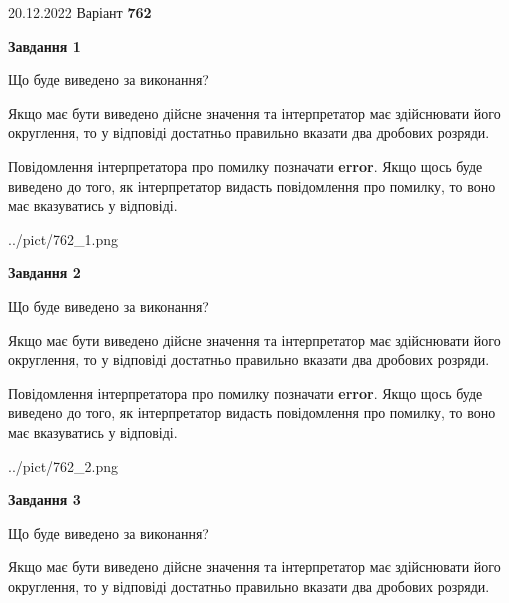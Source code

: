 \documentclass[12pt, ukrainian]{article}
\begin{document}
{20.12.2022 Варіант \No \textbf { 762 }\par}
{
\begin {Large}

{\begin {center}\textbf{Завдання 1}\end {center}}\par
Що буде виведено за виконання? \par

Якщо має бути виведено дійсне значення та інтерпретатор має здійснювати його округлення, 
то у відповіді достатньо правильно вказати два дробових розряди.

Повідомлення інтерпретатора про помилку позначати \textbf{error}.
Якщо щось буде виведено до того, як інтерпретатор видасть повідомлення про помилку, 
то воно має вказуватись у відповіді. \par

\begin{center}
	{../pict/762_1.png}
\end{center}
\newpage

{\begin {center}\textbf{Завдання 2}\end {center}}\par
Що буде виведено за виконання? \par

Якщо має бути виведено дійсне значення та інтерпретатор має здійснювати його округлення, 
то у відповіді достатньо правильно вказати два дробових розряди.

Повідомлення інтерпретатора про помилку позначати \textbf{error}.
Якщо щось буде виведено до того, як інтерпретатор видасть повідомлення про помилку, 
то воно має вказуватись у відповіді. \par

\begin{center}
	{../pict/762_2.png}
\end{center}
\newpage

{\begin {center}\textbf{Завдання 3}\end {center}}\par
Що буде виведено за виконання? \par

Якщо має бути виведено дійсне значення та інтерпретатор має здійснювати його округлення, 
то у відповіді достатньо правильно вказати два дробових розряди.


\end{Large}}
\end{document}
